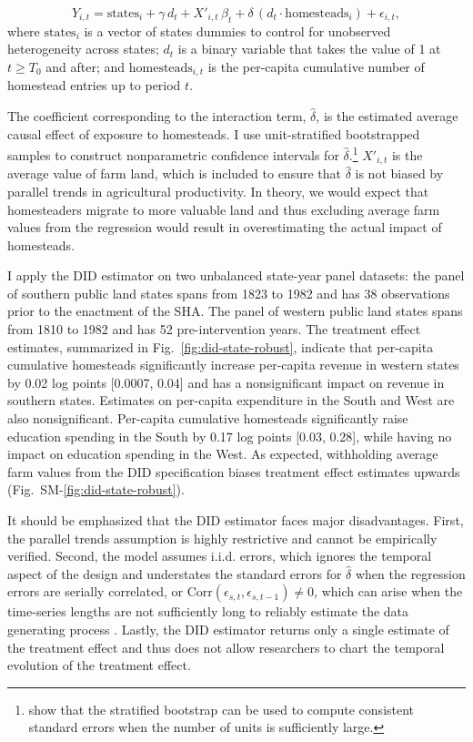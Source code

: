 \documentclass[12pt]{article}
\begin{document}
\begin{equation} 
Y_{i, t} =  \text{states}_i + \gamma \, d_t + X'_{i,t} \, \beta_t + \delta \, (d_t \cdot \text{homesteads}_i) + \epsilon_{i, t}, \label{eq:dd} 
\end{equation}
%
where $\text{states}_i$ is a vector of states dummies to control for unobserved heterogeneity across states; $d_t$ is a binary variable that takes the value of 1 at $t \geq T_0$ and after; and $\text{homesteads}_{i, t}$ is the per-capita cumulative number of homestead entries up to period $t$.

The coefficient corresponding to the interaction term, $\hat{\delta}$, is the estimated average causal effect of exposure to homesteads. I use unit-stratified bootstrapped samples to construct nonparametric confidence intervals for $\hat{\delta}$.\footnote{\citet{bertrand2004much} show that the stratified bootstrap can be used to compute consistent standard errors when the number of units is sufficiently large.} $X'_{i,t}$ is the average value of farm land, which is included to ensure that $\hat{\delta}$ is not biased by parallel trends in agricultural productivity. In theory, we would expect that homesteaders migrate to more valuable land and thus excluding average farm values from the regression would result in overestimating the actual impact of homesteads. 

I apply the DID estimator on two unbalanced state-year panel datasets: the panel of southern public land states spans  from 1823 to 1982 and has 38 observations prior to the enactment of the SHA. The panel of western public land states spans from 1810 to 1982 and has 52 pre-intervention years. The treatment effect estimates, summarized in Fig.~\ref{fig:did-state-robust}, indicate that per-capita cumulative homesteads significantly increase per-capita revenue in western states by 0.02 log points [0.0007, 0.04] and has a nonsignificant impact on revenue in southern states. Estimates on per-capita expenditure in the South and West are also nonsignificant. Per-capita cumulative homesteads significantly raise education spending in the South by 0.17 log points [0.03, 0.28], while having no impact on education spending in the West. As expected, withholding average farm values from the DID specification biases treatment effect estimates upwards (Fig.~SM-\ref{fig:did-state-robust}).

It should be emphasized that the DID estimator faces major disadvantages. First, the parallel trends assumption is highly restrictive and cannot be empirically verified. Second, the model assumes i.i.d. errors, which ignores the temporal aspect of the design and understates the standard errors for $\hat{\delta}$ when the regression errors are serially correlated, or $\mathrm{Corr} (\epsilon_{s, t}, \epsilon_{s, t-1}) \neq 0$, which can arise when the time-series lengths are not sufficiently long to reliably estimate the data generating process \citep{bertrand2004much}. Lastly, the DID estimator returns only a single estimate of the treatment effect and thus does not allow researchers to chart the temporal evolution of the treatment effect. 
\end{document}
